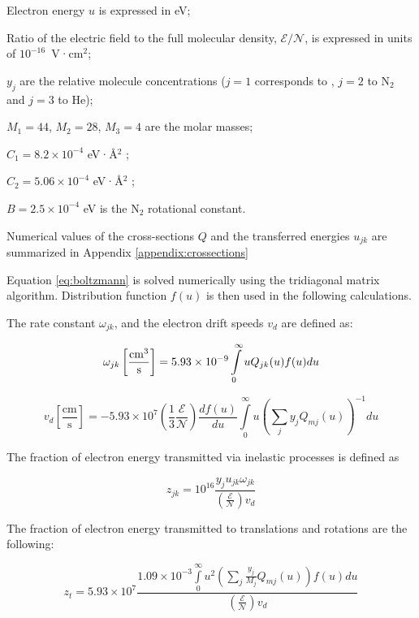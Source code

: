 \documentclass{report}
\begin{document}
Electron energy $u$ is expressed in eV;

Ratio of the electric field to the full molecular density, $\mathcal{E}/\mathcal{N}$, is expressed in units of $10^{-16}$~V·cm$^2$;

$y_j$ are the relative molecule concentrations ($j=1$ corresponds to , $j=2$ to N$_2$ and $j=3$ to He);

$M_1=44$, $M_2=28$, $M_3=4$ are the molar masses;

$C_1 = 8.2 \times 10^{-4}$ eV·Å$^2$ \cite{Hake-1967};

$C_2 = 5.06 \times 10^{-4}$ eV·Å$^2$ \cite{Frost-1962};

$B = 2.5 \times 10^{-4}$ eV is the N$_2$ rotational constant.

Numerical values of the cross-sections $Q$ and the transferred energies $u_{jk}$ are summarized in Appendix \ref{appendix:crossections} 

Equation \ref{eq:boltzmann} is solved numerically using the tridiagonal matrix algorithm. Distribution function $f(u)$ is then used in the following calculations.

The rate constant $\omega_{jk}$, and the electron drift speeds $v_d$ are defined as:

\begin{equation}\label{eq:omega_jk}
\omega _{jk}\left[\frac{\rm{cm}^3}{\text{s}} \right] = 5.93 \times 10^{-9}\int\limits_0^\infty u Q_{jk}(u)f(u)du
\end{equation}
     
\begin{equation}\label{eq:v_d}
v_d \left[ \frac{\text{cm}}{\text{s}} \right] =  - 5.93 \times 10^7 \left( \frac{1}{3}\frac{\mathcal{E}}{\mathcal{N}} \right)\frac{df(u)}{du} \int\limits_0^\infty u \left( \sum\limits_j y_j Q_{mj}(u) \right)^{-1} du
\end{equation}

The fraction of electron energy transmitted via inelastic processes is defined as

\begin{equation}\label{eq:z_jk}
z_{jk} = 10^{16} \frac{y_j u_{jk} \omega _{jk}} {\left( \frac{\mathcal{E}}{\mathcal{N}} \right) v_d}   
\end{equation}

The fraction of electron energy transmitted to translations and rotations are the following:

\begin{equation}\label{eq:z_t}
z_t = 5.93 \times 10^7 \frac{1.09 \times 10^{-3} \int\limits_0^\infty u^2 \left( \sum\limits_j \frac{y_j}{M_j} Q_{mj}(u) \right)f(u)du} {\left( \frac{\mathcal{E}}{\mathcal{N}} \right) v_d}
\end{equation}
\end{document}
